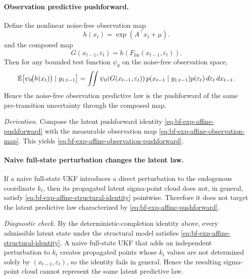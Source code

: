 \paragraph{Observation predictive pushforward.}
\label{lem:bf-exp-affine-observation-pushforward}
Define the nonlinear noise-free observation map
\begin{equation}
  h(x_t)=\exp(A^\top x_t+\mu).
  \label{eq:bf-exp-affine-observation-map}
\end{equation}
and the composed map
\begin{equation}
  G(x_{t-1},\varepsilon_t)
  =
  h\!\left(F_{\mathrm{lin}}(x_{t-1},\varepsilon_t)\right).
  \label{eq:bf-exp-affine-composed-map}
\end{equation}
Then for any bounded test function $\psi_0$ on the noise-free observation
space,
\begin{equation}
  \mathbb{E}\!\left[\psi_0\!\bigl(h(x_t)\bigr)\mid y_{1:t-1}\right]
  =
  \iint
  \psi_0\!\left(G(x_{t-1},\varepsilon_t)\right)
  p(x_{t-1}\mid y_{1:t-1})p(\varepsilon_t)
  \, d\varepsilon_t \, dx_{t-1}.
  \label{eq:bf-exp-affine-observation-pushforward}
\end{equation}
Hence the noise-free observation predictive law is the pushforward of the same
pre-transition uncertainty through the composed map.

\emph{Derivation.}
Compose the latent pushforward identity
\eqref{eq:bf-exp-affine-pushforward} with the measurable observation map
\eqref{eq:bf-exp-affine-observation-map}.  This yields
\eqref{eq:bf-exp-affine-observation-pushforward}.

\paragraph{Naive full-state perturbation changes the latent law.}
\label{lem:bf-exp-affine-naive-full-state-support-violation}
If a naive full-state UKF introduces a direct perturbation to the endogenous
coordinate $k_t$, then its propagated latent sigma-point cloud does not, in
general, satisfy \eqref{eq:bf-exp-affine-structural-identity} pointwise.
Therefore it does not target the latent predictive law characterized by
\eqref{eq:bf-exp-affine-pushforward}.

\emph{Diagnostic check.}
By the deterministic-completion identity above, every admissible
latent state under the structural model satisfies
\eqref{eq:bf-exp-affine-structural-identity}.  A naive full-state UKF that adds
an independent perturbation to $k_t$ creates propagated points whose $k_t$
values are not determined solely by $(x_{t-1},\varepsilon_t)$, so the identity
fails in general.  Hence the resulting sigma-point cloud cannot represent the
same latent predictive law.

